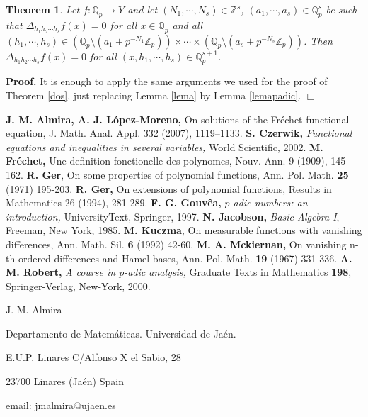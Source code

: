 \documentclass[12pt,a4paper]{amsart}
\newtheorem{theorem}{Theorem}[section]
\theoremstyle{definition}
\begin{document}
\begin{theorem}\label{dospadic} Let $f:\mathbb{Q}_p\to Y$ and let $(N_1,\cdots,N_s)\in\mathbb{Z}^s$, $(a_1,\cdots,a_s)\in\mathbb{Q}_p^s$ be such that  $\Delta_{h_1h_2\cdots h_s}f(x)=0$ for all $x\in\mathbb{Q}_p$ and all $(h_1,\cdots,h_s)\in
\left(\mathbb{Q}_p\setminus (a_1+ p^{-N_1}\mathbb{Z}_p)\right) \times \cdots\times \left(\mathbb{Q}_p\setminus (a_s+ p^{-N_s}\mathbb{Z}_p)\right)$.  Then $\Delta_{h_1h_2\cdots h_s}f(x)=0$ for all $(x,h_1,\cdots,h_s)\in\mathbb{Q}_p^{s+1}$.
\end{theorem}

\noindent \textbf{Proof.}  It is enough to apply the same arguments we used for the proof of Theorem \ref{dos}, just replacing Lemma \ref{lema} by Lemma \ref{lemapadic}. {\hfill $\Box$}

\begin{thebibliography}{99}
 \textbf{J. M. Almira, A. J.  L\'{o}pez-Moreno, } On solutions of the Fr\'{e}chet functional equation, J. Math. Anal. Appl.  332 (2007), 1119--1133.
 \textbf{S. Czerwik, } \textit{Functional equations and inequalities in several variables,} World Scientific, 2002.
 \textbf{M. Fr\'{e}chet, }   Une definition fonctionelle des polynomes,
Nouv. Ann. 9 (1909), 145-162.
  \textbf{R. Ger}, On some properties of polynomial functions,
Ann. Pol. Math. \textbf{25 }(1971) 195-203.
 \textbf{R. Ger, } On extensions of polynomial functions, Results in
Mathematics 26 (1994), 281-289.
  \textbf{F. G. Gouv\^{e}a, } \textit{$p$-adic numbers: an introduction, } UniversityText, Springer, 1997.
 \textbf{N. Jacobson, } \textit{Basic Algebra I}, Freeman, New York, 1985.
 \textbf{M. Kuczma}, On measurable functions with
vanishing differences, Ann. Math. Sil. \textbf{6} (1992) 42-60.
  \textbf{M. A. Mckiernan, }On vanishing n-th ordered
differences and Hamel bases, Ann. Pol. Math. \textbf{19} (1967) 331-336.
 \textbf{A. M. Robert, } \textit{A course in $p$-adic analysis, } Graduate Texts in Mathematics \textbf{198}, Springer-Verlag, New-York, 2000.
\end{thebibliography}

\footnotesize{J. M. Almira

Departamento de Matemáticas. Universidad de Ja\'{e}n.

E.U.P. Linares C/Alfonso X el Sabio, 28

23700 Linares (Ja\'{e}n) Spain

email: {\ttfamily jmalmira@ujaen.es}}
\end{document}

